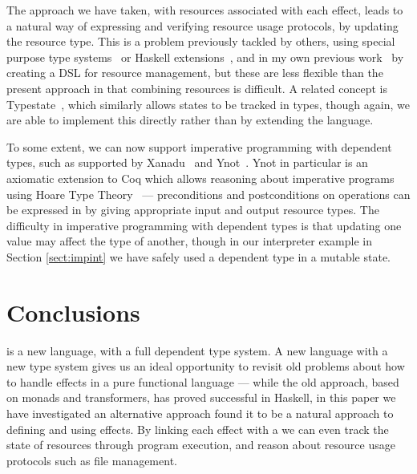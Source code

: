 The approach we have taken, with resources associated with each effect,
leads to a natural way of expressing and verifying resource usage protocols,
by updating the resource type. This is a problem previously tackled by
others, using special purpose type systems~\cite{Walker2000} 
or Haskell extensions~\cite{McBride2011}, and in my own previous
work~\cite{Brady2010a,bradyresource} by creating a DSL for resource management,
but these are less flexible than the present approach in that
combining resources is difficult. 
A related concept is
Typestate~\cite{Aldrich2009,Strom1986}, which similarly allows states to
be tracked in types, though again, we are able to implement this directly
rather than by extending the language. 

To some extent, we can now support imperative programming with dependent
types, such as supported by Xanadu~\cite{Xi2000} and Ynot~\cite{Ynot2008}. 
Ynot in particular is an axiomatic extension to Coq which allows reasoning
about imperative programs using Hoare Type Theory~\cite{HoareTT2008} ---
preconditions and postconditions on operations can be expressed in \Eff{} by
giving appropriate
input and output resource types.
%
The difficulty in imperative programming with dependent types is that
updating one value may affect the type of another, though in our interpreter
example in Section \ref{sect:impint} we have safely used a dependent type
in a mutable state.


\section{Conclusions}

\label{sect:conclusion}

\Idris{} is a new language, with a full dependent type system. A new language
with a new type system gives us an ideal opportunity to revisit old problems
about how to handle effects in a pure functional language --- while the old
approach, based on monads and transformers, has proved successful in
Haskell, in this paper we have investigated an alternative approach 
found it to be a natural approach to defining and using effects.
By linking each effect with a  we can even track the state
of resources through program execution, and reason about resource usage
protocols such as file management. 

